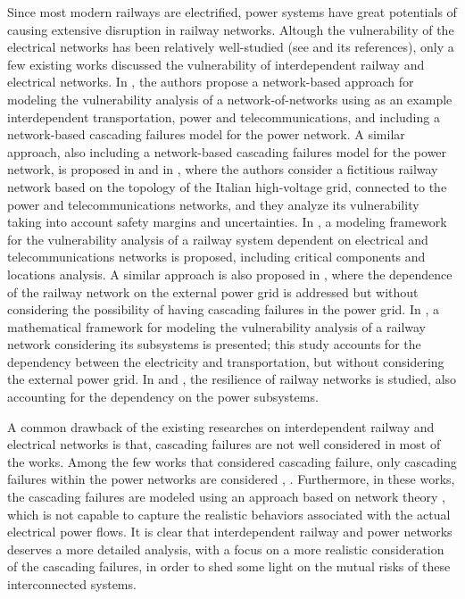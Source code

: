 \documentclass[review]{elsarticle}
\begin{document}
	Since most modern railways are electrified, power systems have great potentials of causing extensive disruption in railway networks. Altough the vulnerability of the electrical networks has been relatively well-studied (see \cite{abedi2019review} and its references), only a few existing works discussed the vulnerability of interdependent railway and electrical networks. In \cite{zhang2014approach}, the authors propose a network-based approach for modeling the vulnerability analysis of a network-of-networks using as an example interdependent transportation, power and telecommunications, and including a network-based cascading failures model for the power network. A similar approach, also including a network-based cascading failures model for the power network, is proposed in \cite{zio2010modeling} and in \cite{zio2011modeling}, where the authors consider a fictitious railway network based on the topology of the Italian high-voltage grid, connected to the power and telecommunications networks, and they analyze its vulnerability taking into account safety margins and uncertainties. In \cite{johansson2010approach}, a modeling framework for the vulnerability analysis of a railway system dependent on electrical and telecommunications networks is proposed, including critical components and locations analysis. A similar approach is also proposed in \cite{johansson2011vulnerability}, where the dependence of the railway network on the external power grid is addressed but without considering the possibility of having cascading failures in the power grid. In \cite{pant2016vulnerability}, a mathematical framework for modeling the vulnerability analysis of a railway network considering its subsystems is presented; this study accounts for the dependency between the electricity and transportation, but without considering the external power grid. In \cite{adjetey2016model} and \cite{dorbritz2011assessing}, the resilience of railway networks is studied, also accounting for the dependency on the power subsystems.
	
	A common drawback of the existing researches on interdependent railway and electrical networks is that, cascading failures are not well considered in most of the works. Among the few works that considered cascading failure, only cascading failures within the power networks are considered \cite{zhang2014approach}, \cite{zio2010modeling}  \cite{zio2011modeling}. Furthermore, in these works, the cascading failures are modeled using an approach based on network theory \cite{motter2002cascade}\cite{crucitti2004model}, which is not capable to capture the realistic behaviors associated with the actual electrical power flows. It is clear that interdependent railway and power networks deserves a more detailed analysis, with a focus on a more realistic consideration of the cascading failures, in order to shed some light on the mutual risks of these interconnected systems.
\end{document}
